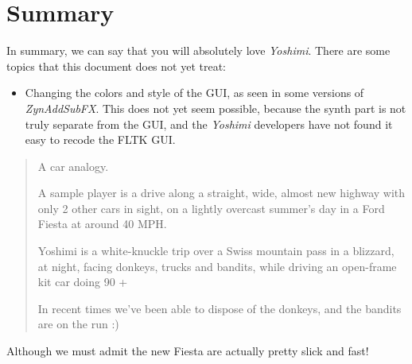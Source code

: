 \documentclass[
 11pt,
 twoside,
 a4paper,
 final                                 %
]{article}
\begin{document}

































\section{Summary}
\label{sec:summary}

   In summary, we can say that you will absolutely love \textsl{Yoshimi}.
   There are some topics that this document does not yet treat:

      \begin{itemize}
         \item Changing the colors and style of the GUI, as seen in some
            versions of \textsl{ZynAddSubFX}.  This does not yet seem possible,
            because the synth part is not truly separate from the GUI, and the
            \textsl{Yoshimi} developers have not found it easy to recode the
            FLTK GUI.
      \end{itemize}

   \begin{quotation}
      A car analogy.

      A sample player is a drive along a straight, wide, almost new highway
      with only 2 other cars in sight, on a lightly overcast summer's day in a
      Ford Fiesta at around 40 MPH.

      Yoshimi is a white-knuckle trip over a Swiss mountain pass in a blizzard,
      at night, facing donkeys, trucks and bandits, while driving an open-frame
      kit car doing 90 +

      In recent times we've been able to dispose of the donkeys, and the
      bandits are on the run :)
   \end{quotation}

   Although we must admit the new Fiesta are actually pretty slick and fast!




\printindex
\end{document}
